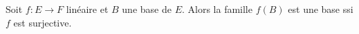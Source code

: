 Soit $f : E \to F$ linéaire et $B$  une base de $E$. Alors la famille $f(B)$ est une base ssi $f$ est surjective.

\begin{reponses}
\end{reponses}

